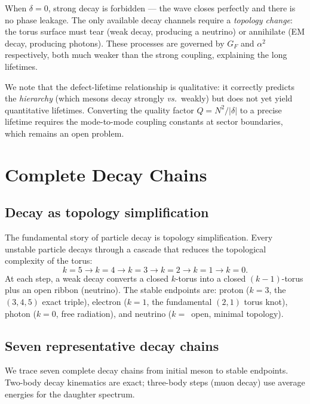 \documentclass[11pt,a4paper]{article}
\begin{document}
When $\delta = 0$, strong decay is forbidden --- the wave closes perfectly and there is no phase leakage. The only available decay channels require a \emph{topology change}: the torus surface must tear (weak decay, producing a neutrino) or annihilate (EM decay, producing photons). These processes are governed by $G_F$ and $\alpha^2$ respectively, both much weaker than the strong coupling, explaining the long lifetimes.

We note that the defect-lifetime relationship is qualitative: it correctly predicts the \emph{hierarchy} (which mesons decay strongly \emph{vs.}\ weakly) but does not yet yield quantitative lifetimes. Converting the quality factor $Q = N^2/|\delta|$ to a precise lifetime requires the mode-to-mode coupling constants at sector boundaries, which remains an open problem.

\section{Complete Decay Chains}
\label{sec:decay-chains}

\subsection{Decay as topology simplification}

The fundamental story of particle decay is topology simplification. Every unstable particle decays through a cascade that reduces the topological complexity of the torus:
\begin{equation}
  k{=}5 \to k{=}4 \to k{=}3 \to k{=}2 \to k{=}1 \to k{=}0.
\end{equation}
At each step, a weak decay converts a closed $k$-torus into a closed $(k{-}1)$-torus plus an open ribbon (neutrino). The stable endpoints are: proton ($k=3$, the $(3,4,5)$ exact triple), electron ($k=1$, the fundamental $(2,1)$ torus knot), photon ($k=0$, free radiation), and neutrino ($k=$~open, minimal topology).

\subsection{Seven representative decay chains}

We trace seven complete decay chains from initial meson to stable endpoints. Two-body decay kinematics are exact; three-body steps (muon decay) use average energies for the daughter spectrum.
\end{document}
